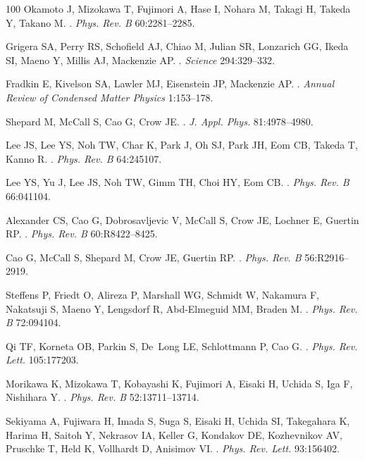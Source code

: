 \documentclass[]{ar2e-changed}%
\begin{document}
\begin{thebibliography}{100}
Okamoto J, Mizokawa T, Fujimori A, Hase I, Nohara M, Takagi H, Takeda Y, Takano
  M.
.
\newblock \emph{Phys. Rev. B} 60:2281--2285.

Grigera SA, Perry RS, Schofield AJ, Chiao M, Julian SR, Lonzarich GG, Ikeda SI,
  Maeno Y, Millis AJ, Mackenzie AP.
.
\newblock \emph{Science} 294:329--332.

Fradkin E, Kivelson SA, Lawler MJ, Eisenstein JP, Mackenzie AP.
.
\newblock \emph{Annual Review of Condensed Matter Physics} 1:153--178.

Shepard M, McCall S, Cao G, Crow JE.
.
\newblock \emph{J. Appl. Phys.} 81:4978--4980.

Lee JS, Lee YS, Noh TW, Char K, Park J, Oh SJ, Park JH, Eom CB, Takeda T, Kanno
  R.
.
\newblock \emph{Phys. Rev. B} 64:245107.

Lee YS, Yu J, Lee JS, Noh TW, Gimm TH, Choi HY, Eom CB.
.
\newblock \emph{Phys. Rev. B} 66:041104.

Alexander CS, Cao G, Dobrosavljevic V, McCall S, Crow JE, Lochner E, Guertin
  RP.
.
\newblock \emph{Phys. Rev. B} 60:R8422--8425.

Cao G, McCall S, Shepard M, Crow JE, Guertin RP.
.
\newblock \emph{Phys. Rev. B} 56:R2916--2919.

Steffens P, Friedt O, Alireza P, Marshall WG, Schmidt W, Nakamura F, Nakatsuji
  S, Maeno Y, Lengsdorf R, Abd-Elmeguid MM, Braden M.
.
\newblock \emph{Phys. Rev. B} 72:094104.

Qi TF, Korneta OB, Parkin S, De~Long LE, Schlottmann P, Cao G.
.
\newblock \emph{Phys. Rev. Lett.} 105:177203.

Morikawa K, Mizokawa T, Kobayashi K, Fujimori A, Eisaki H, Uchida S, Iga F,
  Nishihara Y.
.
\newblock \emph{Phys. Rev. B} 52:13711--13714.

Sekiyama A, Fujiwara H, Imada S, Suga S, Eisaki H, Uchida SI, Takegahara K,
  Harima H, Saitoh Y, Nekrasov IA, Keller G, Kondakov DE, Kozhevnikov AV,
  Pruschke T, Held K, Vollhardt D, Anisimov VI.
.
\newblock \emph{Phys. Rev. Lett.} 93:156402.


\end{thebibliography}
\end{document}
